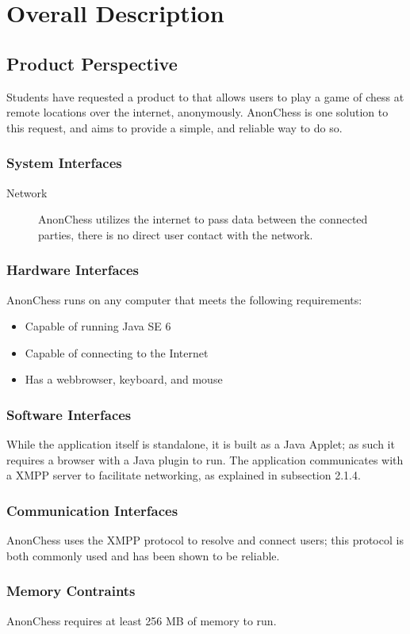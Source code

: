 \section{Overall Description}

\subsection{Product Perspective}
Students have requested a product to that allows users to play a game of chess at remote locations over the internet, anonymously. AnonChess is one solution to this request, and aims to provide a simple, and reliable way to do so.
\subsubsection{System Interfaces}
\begin{description}
\item[Network] AnonChess utilizes the internet to pass data between the connected parties, there is no direct user contact with the network.
\end{description}
\subsubsection{Hardware Interfaces}
AnonChess runs on any computer that meets the following requirements: 
\begin{itemize}
\item{Capable of running Java SE 6}
\item{Capable of connecting to the Internet}
\item{Has a webbrowser, keyboard, and mouse}
\end{itemize}
\subsubsection{Software Interfaces}
 While the application itself is standalone, it is built as a Java Applet; as such it requires a browser with a Java plugin to run. The application communicates with a XMPP server to facilitate networking, as explained in subsection 2.1.4.
\subsubsection{Communication Interfaces}
AnonChess uses the XMPP protocol to resolve and connect users; this protocol is both commonly used and has been shown to be reliable.
\subsubsection{Memory Contraints}
AnonChess requires at least 256 MB of memory to run.
